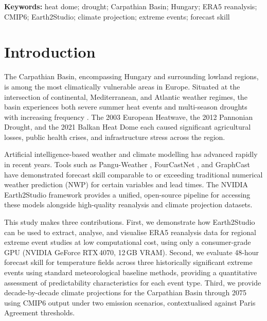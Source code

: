 \documentclass[12pt,a4paper]{article}
\begin{document}
\begin{titlepage}
  \vspace{1cm}

  \noindent\textbf{Keywords:} heat dome; drought; Carpathian Basin; Hungary;
  ERA5 reanalysis; CMIP6; Earth2Studio; climate projection; extreme events;
  forecast skill

\end{titlepage}

\section{Introduction}
\label{sec:intro}

The Carpathian Basin, encompassing Hungary and surrounding lowland regions,
is among the most climatically vulnerable areas in Europe. Situated at the
intersection of continental, Mediterranean, and Atlantic weather regimes,
the basin experiences both severe summer heat events and multi-season
droughts with increasing frequency \citep{ipcc2021}. The 2003 European
Heatwave, the 2012 Pannonian Drought, and the 2021 Balkan Heat Dome each
caused significant agricultural losses, public health crises, and
infrastructure stress across the region.

Artificial intelligence-based weather and climate modelling has advanced
rapidly in recent years. Tools such as Pangu-Weather \citep{bi2023accurate},
FourCastNet \citep{pathak2022fourcastnet}, and GraphCast
\citep{lam2023graphcast} have demonstrated forecast skill comparable to or
exceeding traditional numerical weather prediction (NWP) for certain
variables and lead times. The NVIDIA Earth2Studio framework
\citep{earth2studio2024} provides a unified, open-source pipeline for
accessing these models alongside high-quality reanalysis and climate
projection datasets.

This study makes three contributions. First, we demonstrate how
Earth2Studio can be used to extract, analyse, and visualise ERA5 reanalysis
data for regional extreme event studies at low computational cost, using
only a consumer-grade GPU (NVIDIA GeForce RTX\,4070, 12\,GB VRAM).
Second, we evaluate 48-hour forecast skill for temperature fields across
three historically significant extreme events using standard meteorological
baseline methods, providing a quantitative assessment of predictability
characteristics for each event type. Third, we provide decade-by-decade
climate projections for the Carpathian Basin through 2075 using CMIP6
output under two emission scenarios, contextualised against Paris Agreement
thresholds.
\end{document}

